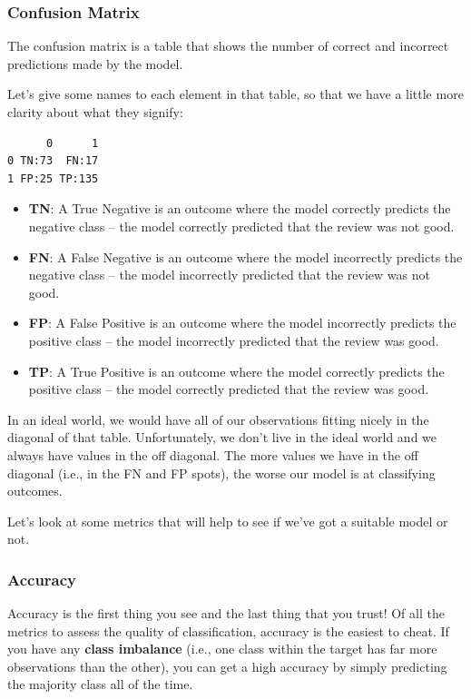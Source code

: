 \documentclass[
  letterpaper,
]{krantz}
\begin{document}
\subsubsection{Confusion Matrix}\label{sec-knowing-metrics-confusion}

The confusion matrix is a table that shows the number of correct and
incorrect predictions made by the model.

Let's give some names to each element in that table, so that we have a
little more clarity about what they signify:

\begin{verbatim}
      0      1
0 TN:73  FN:17
1 FP:25 TP:135
\end{verbatim}

\begin{itemize}
\item
  \textbf{TN}: A True Negative is an outcome where the model correctly
  predicts the negative class -- the model correctly predicted that the
  review was not good.
\item
  \textbf{FN}: A False Negative is an outcome where the model
  incorrectly predicts the negative class -- the model incorrectly
  predicted that the review was not good.
\item
  \textbf{FP}: A False Positive is an outcome where the model
  incorrectly predicts the positive class -- the model incorrectly
  predicted that the review was good.
\item
  \textbf{TP}: A True Positive is an outcome where the model correctly
  predicts the positive class -- the model correctly predicted that the
  review was good.
\end{itemize}

In an ideal world, we would have all of our observations fitting nicely
in the diagonal of that table. Unfortunately, we don't live in the ideal
world and we always have values in the off diagonal. The more values we
have in the off diagonal (i.e., in the FN and FP spots), the worse our
model is at classifying outcomes.

Let's look at some metrics that will help to see if we've got a suitable
model or not.

\subsubsection{Accuracy}\label{accuracy}

Accuracy is the first thing you see and the last thing that you trust!
Of all the metrics to assess the quality of classification, accuracy is
the easiest to cheat. If you have any \textbf{class imbalance} (i.e.,
one class within the target has far more observations than the other),
you can get a high accuracy by simply predicting the majority class all
of the time.
\end{document}
